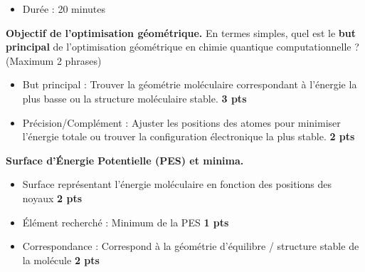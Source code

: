 \documentclass[a4paper,answers]{exam}
\newcommand{\pts}[1]{\textbf{#1 pts}}
\begin{document}
\begin{itemize}
    \item Durée : 20 minutes
\end{itemize}

\vspace{0.2cm}

\begin{questions}

\question[5] \textbf{Objectif de l'optimisation géométrique.} En termes simples, quel est le \textbf{but principal} de l'optimisation géométrique en chimie quantique computationnelle ? (Maximum 2 phrases)

\begin{solution}
\begin{itemize}
    \item But principal : Trouver la géométrie moléculaire correspondant à l'énergie la plus basse ou la structure moléculaire stable. \hfill  \pts{3}
    \item Précision/Complément :  Ajuster les positions des atomes pour minimiser l'énergie totale ou  trouver la configuration électronique la plus stable. \hfill  \pts{2}
\end{itemize}
\end{solution}


\question[5] \textbf{Surface d'Énergie Potentielle (PES) et minima.}

    \begin{solution}
    \begin{itemize}
		\item Surface représentant l'énergie moléculaire en fonction des positions des noyaux \hfill  \pts{2}
        \item Élément recherché : Minimum de la PES \hfill  \pts{1}
        \item Correspondance : Correspond à la géométrie d'équilibre / structure stable de la molécule \hfill  \pts{2}
    \end{itemize}
    \end{solution}



\end{questions}
\end{document}

